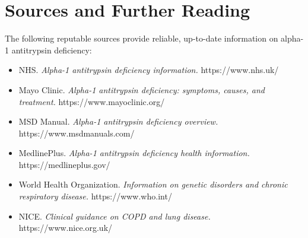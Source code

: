 \section*{Sources and Further Reading}
The following reputable sources provide reliable, up-to-date information on alpha-1 antitrypsin deficiency:

\begin{itemize}
    \item NHS. \textit{Alpha-1 antitrypsin deficiency information.} https://www.nhs.uk/
    \item Mayo Clinic. \textit{Alpha-1 antitrypsin deficiency: symptoms, causes, and treatment.} https://www.mayoclinic.org/
    \item MSD Manual. \textit{Alpha-1 antitrypsin deficiency overview.} https://www.msdmanuals.com/
    \item MedlinePlus. \textit{Alpha-1 antitrypsin deficiency health information.} https://medlineplus.gov/
    \item World Health Organization. \textit{Information on genetic disorders and chronic respiratory disease.} https://www.who.int/
    \item NICE. \textit{Clinical guidance on COPD and lung disease.} https://www.nice.org.uk/
\end{itemize}
